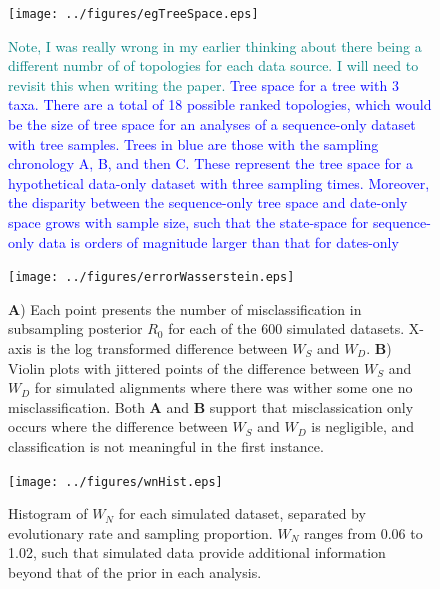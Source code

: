 \documentclass{article}
\begin{document}
\begin{figure}[H]
\centering
\texttt{[image: ../figures/egTreeSpace.eps]}
\caption{\textcolor{teal}{Note, I was really wrong in my earlier thinking about there being a different numbr of of topologies for each data source. I will need to revisit this when writing the paper. }\textcolor{blue}{Tree space for a tree with 3 taxa. There are a total of 18 possible ranked topologies, which would be the size of tree space for an analyses of a sequence-only dataset with tree samples. Trees in blue are those with the sampling chronology A, B, and then C. These represent the tree space for a hypothetical data-only dataset with three sampling times. Moreover, the disparity between the sequence-only tree space and date-only space grows with sample size, such that the state-space for sequence-only data is orders of magnitude larger than that for dates-only}}
\label{fig:treeSpace}
\end{figure}


\begin{figure}[H]
\centering
\texttt{[image: ../figures/errorWasserstein.eps]}
\caption{ \textbf{A}) Each point presents the number of misclassification in subsampling posterior $R_0$ for each of the 600 simulated datasets. X-axis is the log transformed difference between $W_S$ and $W_D$. \textbf{B}) Violin plots with jittered points of the difference between $W_S$ and $W_D$ for simulated alignments where there was wither some one no misclassification. Both \textbf{A} and \textbf{B} support that misclassication only occurs where the difference between $W_S$ and $W_D$ is negligible, and classification is not meaningful in the first instance.}
\label{fig:validateW}
\end{figure}

\begin{figure}[H]
\centering
\texttt{[image: ../figures/wnHist.eps]}
\caption{Histogram of $W_N$ for each simulated dataset, separated by evolutionary rate and sampling proportion. $W_N$ ranges from 0.06 to 1.02, such that simulated data provide additional information beyond that of the prior in each analysis.}
\label{fig:wnHist}
\end{figure}
\end{document}

